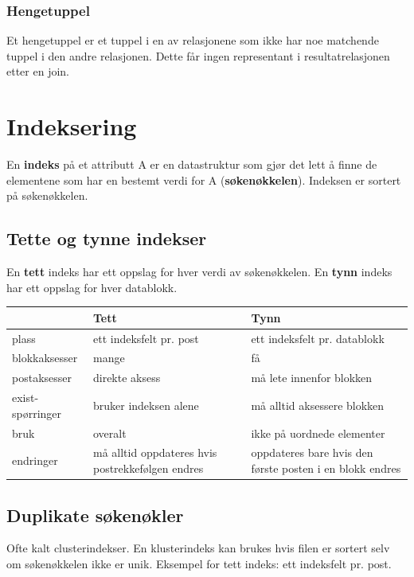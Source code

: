 \documentclass[12pt,a4paper]{article}
\begin{document}
\subsubsection{Hengetuppel}
Et hengetuppel er et tuppel i en av relasjonene som ikke har noe matchende tuppel i den andre relasjonen. Dette får ingen representant i resultatrelasjonen etter en join.

\section{Indeksering}
En \textbf{indeks} på et attributt A er en datastruktur som gjør det lett å finne de elementene som har en bestemt verdi for A (\textbf{søkenøkkelen}). Indeksen er sortert på søkenøkkelen.

\subsection{Tette og tynne indekser}
En \textbf{tett} indeks har ett oppslag for hver verdi av søkenøkkelen. En \textbf{tynn} indeks har ett oppslag for hver datablokk.

\begin{center}
\begin{tabular}{| l | p{5cm} | p{5cm} |}
\hline
& \textbf{Tett} & \textbf{Tynn}\\
\hline
plass & ett indeksfelt pr. post & ett indeksfelt pr. datablokk\\ \hline
blokkaksesser & mange & få\\ \hline
postaksesser & direkte aksess & må lete innenfor blokken\\ \hline
exist-spørringer & bruker indeksen alene & må alltid aksessere blokken\\ \hline
bruk & overalt & ikke på uordnede elementer\\ \hline
endringer & må alltid oppdateres hvis postrekkefølgen endres & oppdateres bare hvis den første posten i en blokk endres\\
\hline
\end{tabular}
\end{center}

\subsection{Duplikate søkenøkler}
Ofte kalt clusterindekser. En klusterindeks kan brukes hvis filen er sortert selv om søkenøkkelen ikke er unik. Eksempel for tett indeks: ett indeksfelt pr. post. 
\end{document}
